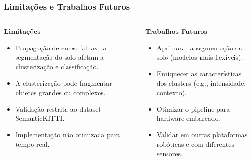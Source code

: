 \documentclass[aspectratio=169,t,xcolor=table]{beamer}
\begin{document}
\begin{frame}
    \frametitle{Limitações e Trabalhos Futuros}
    \begin{columns}[T]
        \begin{column}{.5\textwidth}
            \textbf{Limitações}
            \begin{itemize}
                \item<+-> Propagação de erros: falhas na segmentação do solo afetam a clusterização e classificação.
                \item<+-> A clusterização pode fragmentar objetos grandes ou complexos.
                \item<+-> Validação restrita ao dataset SemanticKITTI.
                \item<+-> Implementação não otimizada para tempo real.
            \end{itemize}
        \end{column}
        \begin{column}{.5\textwidth}
            \textbf{Trabalhos Futuros}
            \begin{itemize}
                \item<+-> Aprimorar a segmentação do solo (modelos mais flexíveis).
                \item<+-> Enriquecer as características dos clusters (e.g., intensidade, contexto).
                \item<+-> Otimizar o pipeline para hardware embarcado.
                \item<+-> Validar em outras plataformas robóticas e com diferentes sensores.
            \end{itemize}
        \end{column}
    \end{columns}
\end{frame}
\end{document}

